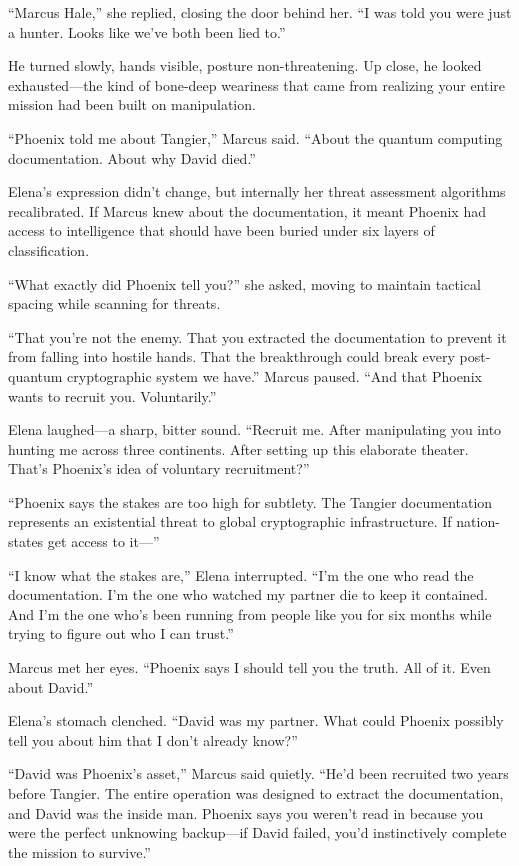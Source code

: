 ``Marcus Hale,'' she replied, closing the door behind her. ``I was told you were just a hunter. Looks like we've both been lied to.''

He turned slowly, hands visible, posture non-threatening. Up close, he looked exhausted---the kind of bone-deep weariness that came from realizing your entire mission had been built on manipulation.

``Phoenix told me about Tangier,'' Marcus said. ``About the quantum computing documentation. About why David died.''

Elena's expression didn't change, but internally her threat assessment algorithms recalibrated. If Marcus knew about the documentation, it meant Phoenix had access to intelligence that should have been buried under six layers of classification.

``What exactly did Phoenix tell you?'' she asked, moving to maintain tactical spacing while scanning for threats.

``That you're not the enemy. That you extracted the documentation to prevent it from falling into hostile hands. That the breakthrough could break every post-quantum cryptographic system we have.'' Marcus paused. ``And that Phoenix wants to recruit you. Voluntarily.''

Elena laughed---a sharp, bitter sound. ``Recruit me. After manipulating you into hunting me across three continents. After setting up this elaborate theater. That's Phoenix's idea of voluntary recruitment?''

``Phoenix says the stakes are too high for subtlety. The Tangier documentation represents an existential threat to global cryptographic infrastructure. If nation-states get access to it---''

``I know what the stakes are,'' Elena interrupted. ``I'm the one who read the documentation. I'm the one who watched my partner die to keep it contained. And I'm the one who's been running from people like you for six months while trying to figure out who I can trust.''

Marcus met her eyes. ``Phoenix says I should tell you the truth. All of it. Even about David.''

Elena's stomach clenched. ``David was my partner. What could Phoenix possibly tell you about him that I don't already know?''

``David was Phoenix's asset,'' Marcus said quietly. ``He'd been recruited two years before Tangier. The entire operation was designed to extract the documentation, and David was the inside man. Phoenix says you weren't read in because you were the perfect unknowing backup---if David failed, you'd instinctively complete the mission to survive.''

